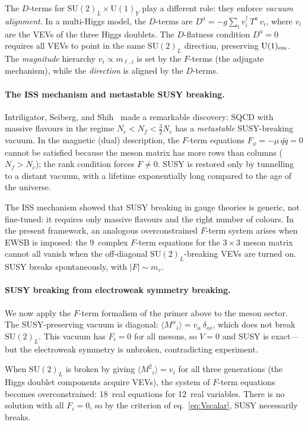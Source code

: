 \documentclass[12pt,a4paper]{article}
\newcommand{\SU}{\mathrm{SU}}
\newcommand{\UU}{\mathrm{U}}
\newcommand{\Nf}{N_f}
\newcommand{\Nc}{N_c}
\begin{document}
The $D$-terms for $\SU(2)_L \times \UU(1)_Y$ play a different
role: they enforce \emph{vacuum alignment}.  In a multi-Higgs
model, the $D$-terms are
$D^a = -g\sum_i v_i^\dagger\,T^a\,v_i$, where $v_i$ are the VEVs
of the three Higgs doublets. The $D$-flatness condition $D^a = 0$
requires all VEVs to point in the same $\SU(2)_L$ direction,
preserving $\UU(1)_{\rm em}$. The \emph{magnitude} hierarchy
$v_i \propto m_{\ell,i}$ is set by the $F$-terms (the adjugate
mechanism), while the \emph{direction} is aligned by the $D$-terms.

\paragraph{The ISS mechanism and metastable SUSY breaking.}
Intriligator, Seiberg, and Shih~\cite{ISS:2006} made a remarkable
discovery: SQCD with massive flavours in the regime
$\Nc < \Nf < \frac{3}{2}\Nc$ has a
\emph{metastable} SUSY-breaking vacuum. In the magnetic (dual)
description, the $F$-term equations $F_\phi = -\mu\,q\tilde q = 0$
cannot be satisfied because the meson matrix has more rows than
columns ($\Nf > \Nc$); the rank condition forces $F \ne 0$.
SUSY is restored only by tunnelling to a distant vacuum,
with a lifetime exponentially long compared to the age of the
universe.

The ISS mechanism showed that SUSY breaking in gauge theories
is generic, not fine-tuned: it requires only massive flavours and
the right number of colours. In the present framework, an
analogous overconstrained $F$-term system arises when EWSB is
imposed: the 9~complex $F$-term equations for the $3\times3$
meson matrix cannot all vanish when the off-diagonal
$\SU(2)_L$-breaking VEVs are turned on.  SUSY breaks
spontaneously, with $|F| \sim m_\tau$.

\paragraph{SUSY breaking from electroweak symmetry breaking.}
We now apply the $F$-term formalism of the primer above to
the meson sector.
The SUSY-preserving vacuum is diagonal:
$\langle M^\alpha{}_i\rangle = v_\alpha\,\delta_{\alpha i}$, which does
not break $\SU(2)_L$. This vacuum has $F_i = 0$ for all mesons,
so $V = 0$ and SUSY is exact---but the electroweak symmetry is
unbroken, contradicting experiment.

When $\SU(2)_L$ is broken by giving
$\langle M^2{}_i\rangle = v_i$ for all three generations (the Higgs
doublet components acquire VEVs), the system of $F$-term equations
becomes overconstrained: 18~real equations for 12~real
variables. There is no solution with all $F_i = 0$, so by the
criterion of eq.~\eqref{eq:Vscalar}, SUSY necessarily breaks.
\end{document}
